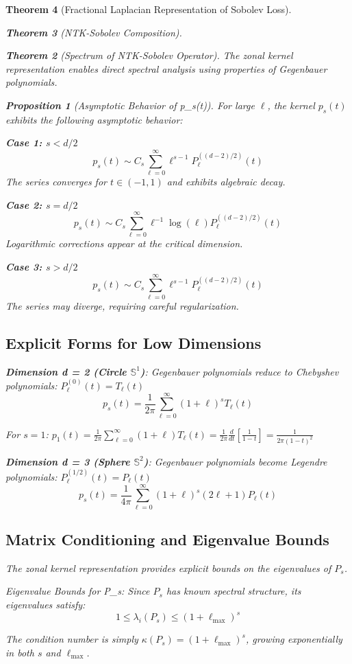 \documentclass{article}
\newtheorem{theorem}{Theorem}[section]
\newtheorem{proposition}[theorem]{Proposition}
\begin{document}
\begin{theorem}[Fractional Laplacian Representation of Sobolev Loss]
\begin{theorem}[NTK-Sobolev Composition]
\begin{theorem}[Spectrum of NTK-Sobolev Operator]
The zonal kernel representation enables direct spectral analysis using properties of Gegenbauer polynomials.

\begin{proposition}[Asymptotic Behavior of p_s(t)]
For large $\ell$, the kernel $p_s(t)$ exhibits the following asymptotic behavior:

\textbf{Case 1: $s < d/2$}
\[ p_s(t) \sim C_s \sum_{\ell=0}^{\infty} \ell^{s-1} P_\ell^{((d-2)/2)}(t) \]
The series converges for $t \in (-1, 1)$ and exhibits algebraic decay.

\textbf{Case 2: $s = d/2$} 
\[ p_s(t) \sim C_s \sum_{\ell=0}^{\infty} \ell^{-1} \log(\ell) P_\ell^{((d-2)/2)}(t) \]
Logarithmic corrections appear at the critical dimension.

\textbf{Case 3: $s > d/2$}
\[ p_s(t) \sim C_s \sum_{\ell=0}^{\infty} \ell^{s-1} P_\ell^{((d-2)/2)}(t) \]
The series may diverge, requiring careful regularization.
\end{proposition}

\subsection{Explicit Forms for Low Dimensions}

\textbf{Dimension d = 2 (Circle $\mathbb{S}^1$)}:
Gegenbauer polynomials reduce to Chebyshev polynomials: $P_\ell^{(0)}(t) = T_\ell(t)$
\[ p_s(t) = \frac{1}{2\pi} \sum_{\ell=0}^{\infty} (1 + \ell)^s T_\ell(t) \]

For $s = 1$: $p_1(t) = \frac{1}{2\pi} \sum_{\ell=0}^{\infty} (1 + \ell) T_\ell(t) = \frac{1}{2\pi} \frac{d}{dt}\left[\frac{1}{1-t}\right] = \frac{1}{2\pi(1-t)^2}$

\textbf{Dimension d = 3 (Sphere $\mathbb{S}^2$)}:
Gegenbauer polynomials become Legendre polynomials: $P_\ell^{(1/2)}(t) = P_\ell(t)$
\[ p_s(t) = \frac{1}{4\pi} \sum_{\ell=0}^{\infty} (1 + \ell)^s (2\ell + 1) P_\ell(t) \]

\subsection{Matrix Conditioning and Eigenvalue Bounds}

The zonal kernel representation provides explicit bounds on the eigenvalues of $P_s$.

Eigenvalue Bounds for P_s: Since $P_s$ has known spectral structure, its eigenvalues satisfy:
\[ 1 \leq \lambda_i(P_s) \leq (1 + \ell_{\max})^s \]

The condition number is simply $\kappa(P_s) = (1 + \ell_{\max})^s$, growing exponentially in both $s$ and $\ell_{\max}$.


\end{theorem}
\end{theorem}
\end{theorem}
\end{document}
